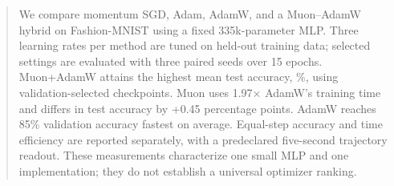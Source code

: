 \begin{abstract}
We compare momentum SGD, Adam, AdamW, and a Muon--AdamW hybrid on Fashion-MNIST using a fixed 335k-parameter MLP. Three learning rates per method are tuned on held-out training data; selected settings are evaluated with three paired seeds over 15 epochs. Muon+AdamW attains the highest mean test accuracy, \%, using validation-selected checkpoints. Muon uses 1.97$\times$ AdamW's training time and differs in test accuracy by +0.45 percentage points. AdamW reaches 85\% validation accuracy fastest on average. Equal-step accuracy and time efficiency are reported separately, with a predeclared five-second trajectory readout. These measurements characterize one small MLP and one implementation; they do not establish a universal optimizer ranking.
\end{abstract}
